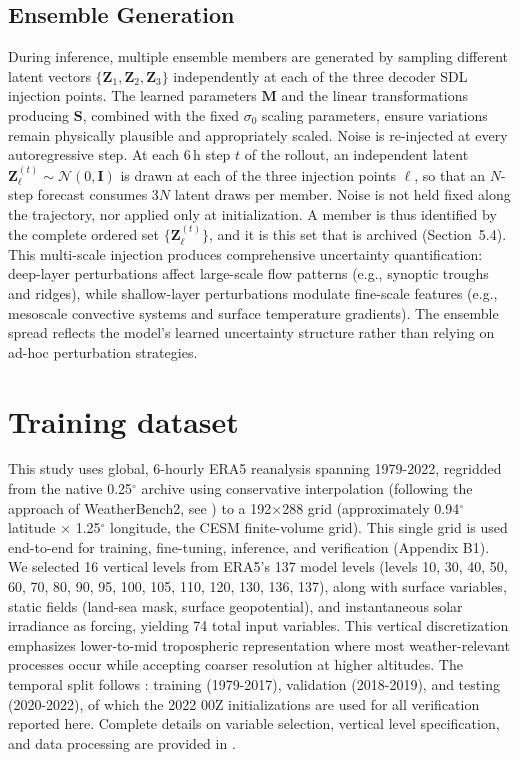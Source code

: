 \documentclass{agujournal2019}
\begin{document}
\subsection{Ensemble Generation}
During inference, multiple ensemble members are generated by sampling different latent vectors $\{\mathbf{Z}_1, \mathbf{Z}_2, \mathbf{Z}_3\}$ independently at each of the three decoder SDL injection points. The learned parameters $\mathbf{M}$ and the linear transformations producing $\mathbf{S}$, combined with the fixed $\sigma_0$ scaling parameters, ensure variations remain physically plausible and appropriately scaled. Noise is re-injected at every autoregressive step. At each 6\,h step $t$ of the rollout, an independent latent $\mathbf{Z}_\ell^{(t)} \sim \mathcal{N}(0,\mathbf{I})$ is drawn at each of the three injection points $\ell$, so that an $N$-step forecast consumes $3N$ latent draws per member. Noise is not held fixed along the trajectory, nor applied only at initialization. A member is thus identified by the complete ordered set $\{\mathbf{Z}_\ell^{(t)}\}$, and it is this set that is archived (Section~5.4). This multi-scale injection produces comprehensive uncertainty quantification: deep-layer perturbations affect large-scale flow patterns (e.g., synoptic troughs and ridges), while shallow-layer perturbations modulate fine-scale features (e.g., mesoscale convective systems and surface temperature gradients). The ensemble spread reflects the model's learned uncertainty structure rather than relying on ad-hoc perturbation strategies.

\section{Training dataset}
This study uses global, 6-hourly ERA5 reanalysis \cite{hersbach2020era5} spanning 1979-2022, regridded from the native 0.25$^\circ$ archive using conservative interpolation (following the approach of WeatherBench2, see \cite{sha2025conservation, sha2025terrain}) to a 192$\times$288 grid (approximately 0.94$^\circ$ latitude $\times$ 1.25$^\circ$ longitude, the CESM finite-volume grid). This single grid is used end-to-end for training, fine-tuning, inference, and verification (Appendix B1). We selected 16 vertical levels from ERA5's 137 model levels (levels 10, 30, 40, 50, 60, 70, 80, 90, 95, 100, 105, 110, 120, 130, 136, 137), along with surface variables, static fields (land-sea mask, surface geopotential), and instantaneous solar irradiance as forcing, yielding 74 total input variables. This vertical discretization emphasizes lower-to-mid tropospheric representation where most weather-relevant processes occur while accepting coarser resolution at higher altitudes. The temporal split follows \cite{schreck2025}: training (1979-2017), validation (2018-2019), and testing (2020-2022), of which the 2022 00Z initializations are used for all verification reported here. Complete details on variable selection, vertical level specification, and data processing are provided in \cite{schreck2025, sha2025terrain}.
\end{document}
